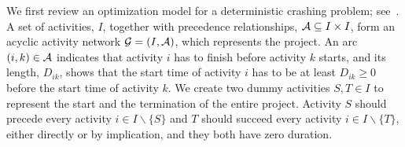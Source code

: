 \documentclass[11pt]{article}
\newcommand{\cA}{{\cal A}}
\newcommand{\noi}{\noindent}
\begin{document}
		\noi We first review an optimization model for a deterministic crashing problem; see~\citet{fulkerson1961network, kelley1961criticalpath}. A set of activities, \(I\), together with precedence relationships, \(\cA \subseteq I \times I\), form an acyclic activity network \(\mathcal{G} = (I,\cA)\), which represents the project. An arc \((i,k) \in \cA\) indicates that activity \(i\) has to finish before activity \(k\) starts, and its length, \(D_{ik}\), shows that the start time of activity \(i\) has to be at least \(D_{ik} \ge 0\) before the start time of activity \(k\). We create two dummy activities \(S, T \in I\) to represent the start and the termination of the entire project. Activity \(S\) should precede every activity \(i \in I \backslash \{S\}\) and \(T\) should succeed every activity \(i \in I \backslash \{T\}\), either directly or by implication, and they both have zero duration.
		
\end{document}
